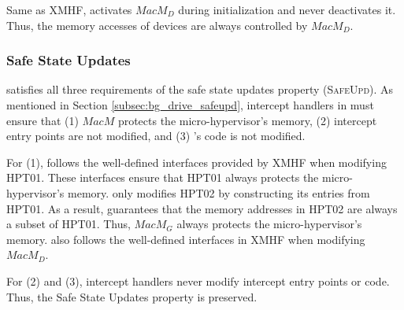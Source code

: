 Same as XMHF,  activates $MacM_D$ during initialization and never deactivates it. Thus, the memory accesses of devices are always controlled by $MacM_D$.

\subsubsection{Safe State Updates}

 satisfies all three requirements of the safe state updates property (\textsc{SafeUpd}). As mentioned in Section \ref{subsec:bg_drive_safeupd}, intercept handlers in  must ensure that (1) $MacM$ protects the micro-hypervisor's memory, (2) intercept entry points are not modified, and (3) 's code is not modified.

For (1),  follows the well-defined interfaces provided by XMHF when modifying HPT01. These interfaces ensure that HPT01 always protects the micro-hypervisor's memory.  only modifies HPT02 by constructing its entries from HPT01. As a result,  guarantees that the memory addresses in HPT02 are always a subset of HPT01. Thus, $MacM_G$ always protects the micro-hypervisor's memory.  also follows the well-defined interfaces in XMHF when modifying $MacM_D$.

For (2) and (3),  intercept handlers never modify intercept entry points or  code. Thus, the Safe State Updates property is preserved.

